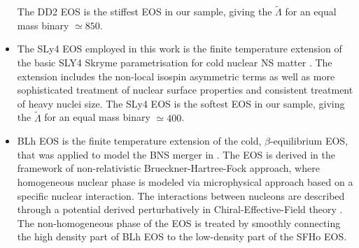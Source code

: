 \begin{itemize}
    The DD2 \ac{EOS} is the stiffest \ac{EOS} in our sample, giving the 
    $\tilde{\Lambda}$ for an equal mass binary ${\simeq}850$. 
    \item The SLy4 \ac{EOS} employed in this work is the finite temperature extension \citep{daSilvaSchneider:2017jpg}
    of the basic SLY4 Skryme parametrisation for cold nuclear \ac{NS} matter \citep{Douchin:2001sv}.
    The extension includes the non-local isospin asymmetric terms as well as more sophisticated 
    treatment of nuclear surface properties and consistent treatment of heavy nuclei size. 
    The SLy4 \ac{EOS} is the softest \ac{EOS} in our sample, 
    giving the $\tilde{\Lambda}$ for an equal mass binary ${\simeq}400$. 
    \item BLh \ac{EOS} \citep{Logoteta:2020yxf} is the
    finite temperature extension of the cold, $\beta$-equilibrium \ac{EOS}, \citep{Bombaci:2018ksa}
    that was applied to model the \ac{BNS} merger in \citet{Endrizzi:2018uwl}.
    The \ac{EOS} is derived in the framework of non-relativistic Brueckner-Hartree-Fock approach,
    where homogeneous nuclear phase is modeled via 
    microphysical approach based on a specific nuclear interaction.
    The interactions between nucleons are described through a potential derived perturbatively 
    in Chiral-Effective-Field theory \citep{Machleidt:2011zz}.
    The non-homogeneous phase of the \ac{EOS} is treated by smoothly connecting the high density part of 
    BLh \ac{EOS} to the low-density part of the SFHo \ac{EOS}.
\end{itemize}



